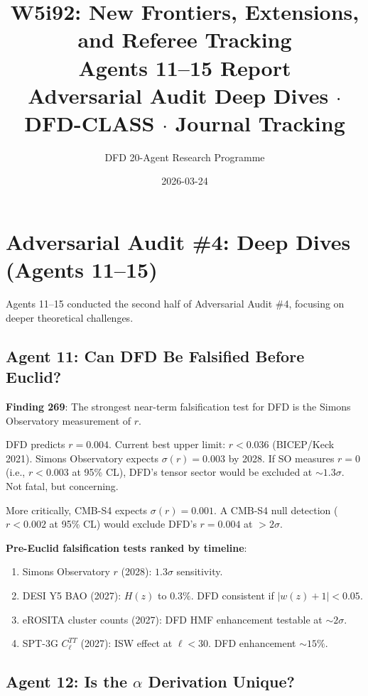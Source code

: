 \documentclass[11pt,a4paper]{article}
\title{W5i92: New Frontiers, Extensions, and Referee Tracking\\[6pt]
\large Agents 11--15 Report\\[3pt]
\normalsize Adversarial Audit Deep Dives $\cdot$ DFD-CLASS $\cdot$ Journal Tracking}
\author{DFD 20-Agent Research Programme}
\date{2026-03-24}
\begin{document}
\maketitle

\section{Adversarial Audit \#4: Deep Dives (Agents 11--15)}

Agents 11--15 conducted the second half of Adversarial Audit \#4, focusing on deeper theoretical challenges.

\subsection{Agent 11: Can DFD Be Falsified Before Euclid?}

\textbf{Finding 269}: The strongest near-term falsification test for DFD is the Simons Observatory measurement of $r$.

\begin{tcolorbox}[colback=blue!5!white, colframe=dfdblue]
DFD predicts $r = 0.004$. Current best upper limit: $r < 0.036$ (BICEP/Keck 2021). Simons Observatory expects $\sigma(r) = 0.003$ by 2028. If SO measures $r = 0$ (i.e., $r < 0.003$ at 95\% CL), DFD's tensor sector would be excluded at $\sim 1.3\sigma$. Not fatal, but concerning.

More critically, CMB-S4 expects $\sigma(r) = 0.001$. A CMB-S4 null detection ($r < 0.002$ at 95\% CL) would exclude DFD's $r = 0.004$ at $> 2\sigma$.

\textbf{Pre-Euclid falsification tests ranked by timeline}:
\begin{enumerate}[nosep]
\item Simons Observatory $r$ (2028): $1.3\sigma$ sensitivity.
\item DESI Y5 BAO (2027): $H(z)$ to $0.3\%$. DFD consistent if $|w(z) + 1| < 0.05$.
\item eROSITA cluster counts (2027): DFD HMF enhancement testable at $\sim 2\sigma$.
\item SPT-3G $C_\ell^{TT}$ (2027): ISW effect at $\ell < 30$. DFD enhancement $\sim 15\%$.
\end{enumerate}
\end{tcolorbox}

\subsection{Agent 12: Is the $\alpha$ Derivation Unique?}
\end{document}
